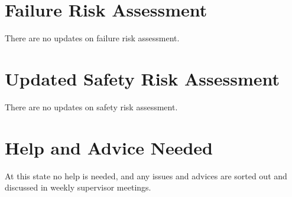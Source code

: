 \documentclass[a4paper,12pt]{article}
\begin{document}
\section{Failure Risk Assessment}
There are no updates on failure risk assessment. 

\section{Updated Safety Risk Assessment}
There are no updates on safety risk assessment.

\section{Help and Advice Needed}
At this state no help is needed, and any issues and advices are sorted out and discussed in weekly supervisor meetings.
\end{document}
